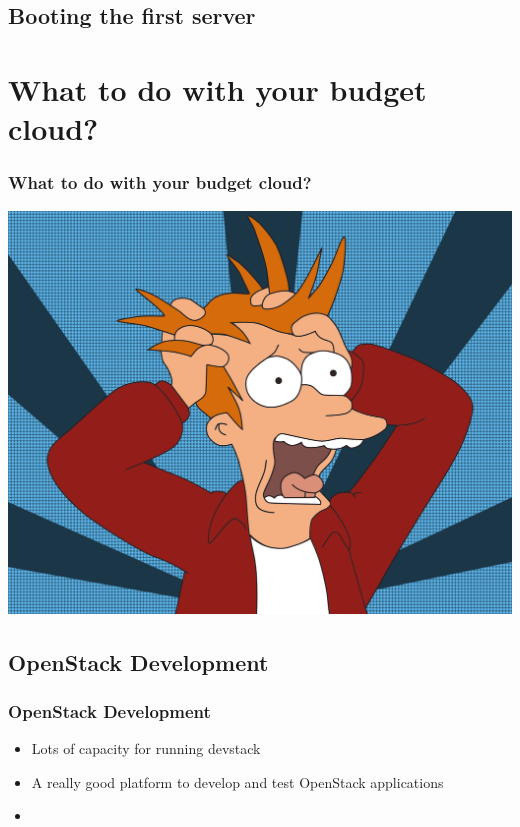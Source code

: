 \documentclass[aspectratio=169,11pt,hyperref={colorlinks=true}]{beamer}
\begin{document}
\subsection{Booting the first server}
\begin{frame}
    
\end{frame}

\section{What to do with your budget cloud?}
\begin{frame}
    \frametitle{What to do with your budget cloud?}
    \centering
    \includegraphics[width=.85\textwidth]{futurama-fry.png}
\end{frame}

\subsection{OpenStack Development}
\begin{frame}
    \frametitle{OpenStack Development}
    \begin{itemize}
        \item Lots of capacity for running devstack
        \item A really good platform to develop and test OpenStack
              applications
        \item
    \end{itemize}
\end{frame}
\end{document}
